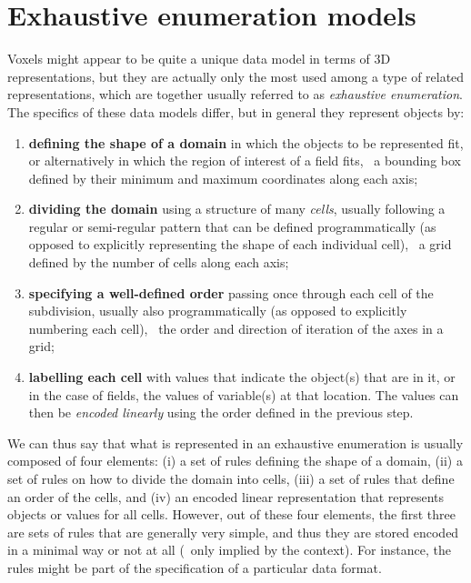 \section{Exhaustive enumeration models}

Voxels might appear to be quite a unique data model in terms of 3D representations, but they are actually only the most used among a type of related representations, which are together usually referred to as \emph{exhaustive enumeration}.
The specifics of these data models differ, but in general they represent objects by:

\begin{enumerate}

\item \textbf{defining the shape of a domain} in which the objects to be represented fit, or alternatively in which the region of interest of a field fits, \eg\ a bounding box defined by their minimum and maximum coordinates along each axis;

\item \textbf{dividing the domain} using a structure of many \emph{cells}, usually following a regular or semi-regular pattern that can be defined programmatically (as opposed to explicitly representing the shape of each individual cell), \eg\ a grid defined by the number of cells along each axis;

\item \textbf{specifying a well-defined order} passing once through each cell of the subdivision, usually also programmatically (as opposed to explicitly numbering each cell), \eg\ the order and direction of iteration of the axes in a grid;

\item \textbf{labelling each cell} with values that indicate the object(s) that are in it, or in the case of fields, the values of variable(s) at that location.
The values can then be \emph{encoded linearly} using the order defined in the previous step.

\end{enumerate}

We can thus say that what is represented in an exhaustive enumeration is usually composed of four elements: (i) a set of rules defining the shape of a domain, (ii) a set of rules on how to divide the domain into cells, (iii) a set of rules that define an order of the cells, and (iv) an encoded linear representation that represents objects or values for all cells.
However, out of these four elements, the first three are sets of rules that are generally very simple, and thus they are stored encoded in a minimal way or not at all (\ie\ only implied by the context).
For instance, the rules might be part of the specification of a particular data format.

